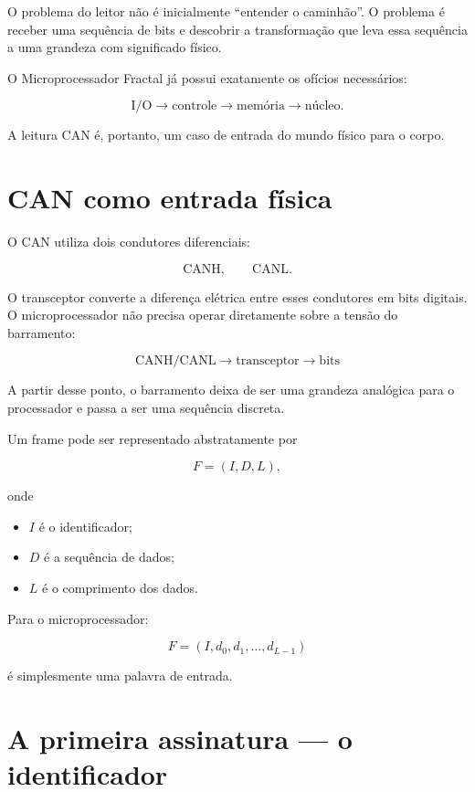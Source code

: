 \documentclass[11pt,a4paper]{article}
\begin{document}
O problema do leitor não é inicialmente ``entender o caminhão''. O problema é
receber uma sequência de bits e descobrir a transformação que leva essa sequência
a uma grandeza com significado físico.

O Microprocessador Fractal já possui exatamente os ofícios necessários:

\[
\text{I/O}
\rightarrow
\text{controle}
\rightarrow
\text{memória}
\rightarrow
\text{núcleo}.
\]

A leitura CAN é, portanto, um caso de entrada do mundo físico para o corpo.


\section{CAN como entrada física}

O CAN utiliza dois condutores diferenciais:

\[
\mathrm{CANH},\qquad \mathrm{CANL}.
\]

O transceptor converte a diferença elétrica entre esses condutores em bits digitais.
O microprocessador não precisa operar diretamente sobre a tensão do barramento:

\[
\boxed{
\text{CANH/CANL}
\rightarrow
\text{transceptor}
\rightarrow
\text{bits}
}
\]

A partir desse ponto, o barramento deixa de ser uma grandeza analógica para o
processador e passa a ser uma sequência discreta.

Um frame pode ser representado abstratamente por

\[
F=(I,D,L),
\]

onde

\begin{itemize}
\item $I$ é o identificador;
\item $D$ é a sequência de dados;
\item $L$ é o comprimento dos dados.
\end{itemize}

Para o microprocessador:

\[
\boxed{
F=(I,d_0,d_1,\ldots,d_{L-1})
}
\]

é simplesmente uma palavra de entrada.


\section{A primeira assinatura --- o identificador}
\end{document}
